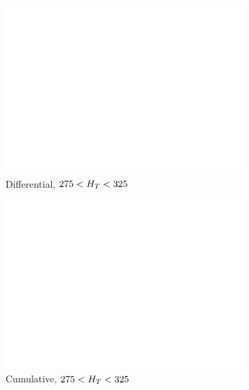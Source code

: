 \begin{figure}[p!]
\begin{subfigure}[b]{0.48\textwidth}
      \includegraphics[width=\textwidth,page=11, trim=0 0 0 20, clip=true]{Figs/trigger/HT275_325_73_73_36_AlphaT_le3j_RunAtFNAL}
      \caption{Differential, $275 < H_T < 325 $~\gev}
    \end{subfigure}
    \begin{subfigure}[b]{0.48\textwidth}
      \includegraphics[width=\textwidth,page=18, trim=0 0 0 20, clip=true]{Figs/trigger/HT275_325_73_73_36_AlphaT_le3j_RunAtFNAL}
      \caption{Cumulative, $275 < H_T < 325 $~\gev}
    \end{subfigure} \\
    \vspace{0.5cm}\begin{subfigure}[b]{0.48\textwidth}

\end{subfigure}
\end{figure}
